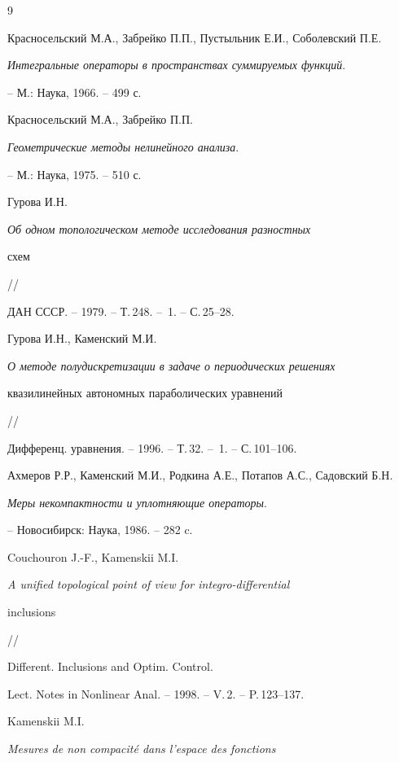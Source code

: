 \begin{thebibliography}{9}







Красносельский М.А., Забрейко П.П., Пустыльник Е.И., Соболевский П.Е. 


{\em Интегральные операторы в пространствах суммируемых функций}.


-- М.: Наука, 1966. -- 499 с.




Красносельский М.А., Забрейко П.П. 


{\em Геометрические методы нелинейного анализа}.


-- М.: Наука, 1975. -- 510 с.




Гурова И.Н.


{\em Об одном топологическом методе исследования разностных 


схем }//


ДАН СССР. -- 1979. -- Т.\,248. -- \No\,1. -- С.\,25--28.




Гурова И.Н., Каменский М.И.


{\em О методе полудискретизации в задаче о периодических решениях


квазилинейных автономных параболических уравнений} //


Дифференц. уравнения. -- 1996. -- Т.\,32. -- \No\,1. -- С.\,101--106.




Ахмеров Р.Р., Каменский М.И., Родкина А.Е., Потапов А.С., Садовский Б.Н.


{\em Меры некомпактности и уплотняющие операторы}.


-- Новосибирск: Наука, 1986. -- 282 c.




Couchouron J.-F., Kamenskii M.I.


{\em A unified topological point of view for integro-differential 


inclusions} //


Different. Inclusions and Optim. Control.


Lect. Notes in Nonlinear Anal. -- 1998. -- V.\,2. -- P.\,123--137.




Kamenskii M.I.


{\em Mesures de non compacit\'e dans l'espace des fonctions


}
\end{thebibliography}
